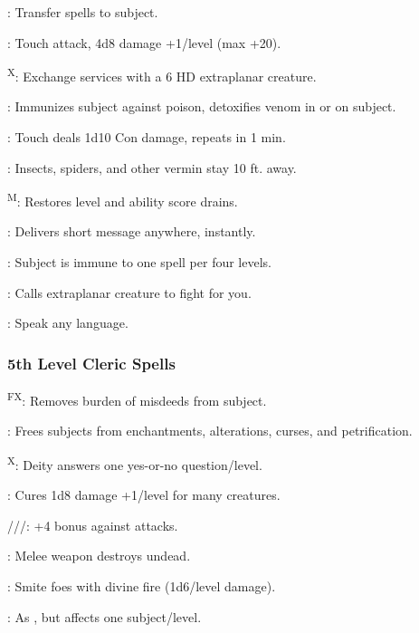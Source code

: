 : Transfer spells to subject.

: Touch attack, 4d8 damage +1/level (max +20).

\textsuperscript{X}: Exchange services with a 6 HD extraplanar creature.

: Immunizes subject against poison, detoxifies venom in or on subject.

: Touch deals 1d10 Con damage, repeats in 1 min.

: Insects, spiders, and other vermin stay 10 ft. away.

\textsuperscript{M}: Restores level and ability score drains.

: Delivers short message anywhere, instantly.

: Subject is immune to one spell per four levels.

: Calls extraplanar creature to fight for you.

: Speak any language.

\subsubsection{5th Level Cleric Spells}

\textsuperscript{F}\textsuperscript{X}: Removes burden of misdeeds from subject.

: Frees subjects from enchantments, alterations, curses, and petrification.

\textsuperscript{X}: Deity answers one yes-or-no question/level.

: Cures 1d8 damage +1/level for many creatures.

///: +4 bonus against attacks.

: Melee weapon destroys undead.

: Smite foes with divine fire (1d6/level damage).

: As , but affects one subject/level.

